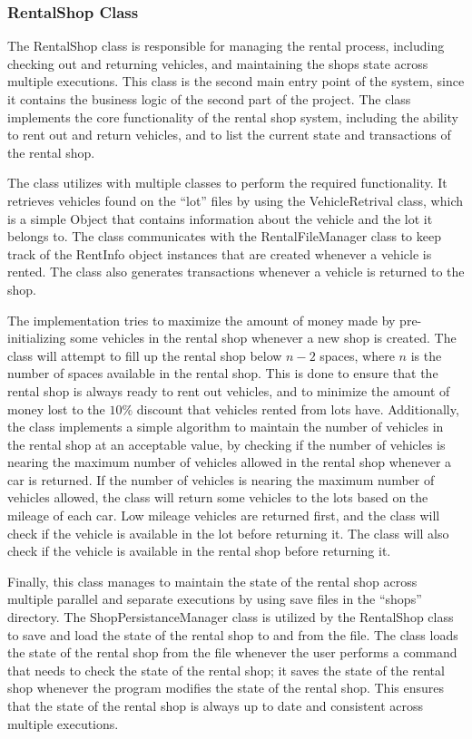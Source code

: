 \documentclass[conference]{IEEEtran}
\begin{document}
\subsubsection{RentalShop Class}
The RentalShop class is responsible for managing the rental process, including checking out and returning vehicles, and maintaining the shops state across multiple executions. This class is the second main entry point of the system, since it contains the business logic of the second part of the project. The class implements the core functionality of the rental shop system, including the ability to rent out and return vehicles, and to list the current state and transactions of the rental shop. 

The class utilizes with multiple classes to perform the required functionality. It retrieves vehicles found on the ``lot'' files by using the VehicleRetrival class, which is a simple Object that contains information about the vehicle and the lot it belongs to. The class communicates with the RentalFileManager class to keep track of the RentInfo object instances that are created whenever a vehicle is rented. The class also generates transactions whenever a vehicle is returned to the shop. 

The implementation tries to maximize the amount of money made by pre-initializing some vehicles in the rental shop whenever a new shop is created. The class will attempt to fill up the rental shop below $n-2$ spaces, where $n$ is the number of spaces available in the rental shop. This is done to ensure that the rental shop is always ready to rent out vehicles, and to minimize the amount of money lost to the $10\%$ discount that vehicles rented from lots have. 
Additionally, the class implements a simple algorithm to maintain the number of vehicles in the rental shop at an acceptable value, by checking if the number of vehicles is nearing the maximum number of vehicles allowed in the rental shop whenever a car is returned. If the number of vehicles is nearing the maximum number of vehicles allowed, the class will return some vehicles to the lots based on the mileage of each car. Low mileage vehicles are returned first, and the class will check if the vehicle is available in the lot before returning it. The class will also check if the vehicle is available in the rental shop before returning it.

Finally, this class manages to maintain the state of the rental shop across multiple parallel and separate executions by using save files in the ``shops'' directory. The ShopPersistanceManager class is utilized by the RentalShop class to save and load the state of the rental shop to and from the file. The class loads the state of the rental shop from the file whenever the user performs a command that needs to check the state of the rental shop; it saves the state of the rental shop whenever the program modifies the state of the rental shop. This ensures that the state of the rental shop is always up to date and consistent across multiple executions.
\end{document}
